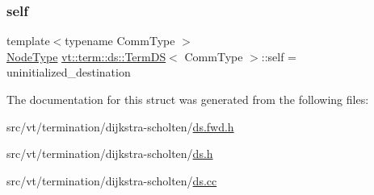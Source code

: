 \mbox{\label{structvt_1_1term_1_1ds_1_1_term_d_s_adadcd6e130836bc8d8a6819797f6900b}} 
\subsubsection{\texorpdfstring{self}{self}}
{\footnotesize\ttfamily template$<$typename Comm\+Type $>$ \\
\hyperlink{namespacevt_a866da9d0efc19c0a1ce79e9e492f47e2}{Node\+Type} \hyperlink{structvt_1_1term_1_1ds_1_1_term_d_s}{vt\+::term\+::ds\+::\+Term\+DS}$<$ Comm\+Type $>$\+::self = uninitialized\+\_\+destination\hspace{0.3cm}{\ttfamily [protected]}}



The documentation for this struct was generated from the following files\+:\begin{DoxyCompactItemize}
\item 
src/vt/termination/dijkstra-\/scholten/\hyperlink{ds_8fwd_8h}{ds.\+fwd.\+h}\item 
src/vt/termination/dijkstra-\/scholten/\hyperlink{ds_8h}{ds.\+h}\item 
src/vt/termination/dijkstra-\/scholten/\hyperlink{ds_8cc}{ds.\+cc}\end{DoxyCompactItemize}

